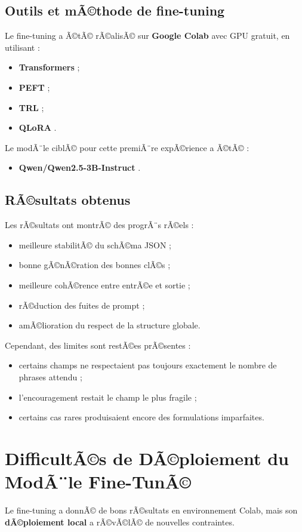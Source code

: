 ﻿\documentclass[12pt,a4paper]{article}
\begin{document}
\subsection{Outils et mÃ©thode de fine-tuning}
Le fine-tuning a Ã©tÃ© rÃ©alisÃ© sur \textbf{Google Colab} avec GPU gratuit, en utilisant :
\begin{itemize}
    \item \textbf{Transformers} \cite{transformers} ;
    \item \textbf{PEFT} \cite{peft} ;
    \item \textbf{TRL} ;
    \item \textbf{QLoRA} \cite{qlora}.
\end{itemize}

Le modÃ¨le ciblÃ© pour cette premiÃ¨re expÃ©rience a Ã©tÃ© :
\begin{itemize}
    \item \textbf{Qwen/Qwen2.5-3B-Instruct} \cite{qwen25}.
\end{itemize}

\subsection{RÃ©sultats obtenus}
Les rÃ©sultats ont montrÃ© des progrÃ¨s rÃ©els :
\begin{itemize}
    \item meilleure stabilitÃ© du schÃ©ma JSON ;
    \item bonne gÃ©nÃ©ration des bonnes clÃ©s ;
    \item meilleure cohÃ©rence entre entrÃ©e et sortie ;
    \item rÃ©duction des fuites de prompt ;
    \item amÃ©lioration du respect de la structure globale.
\end{itemize}

Cependant, des limites sont restÃ©es prÃ©sentes :
\begin{itemize}
    \item certains champs ne respectaient pas toujours exactement le nombre de phrases attendu ;
    \item l'encouragement restait le champ le plus fragile ;
    \item certains cas rares produisaient encore des formulations imparfaites.
\end{itemize}

\section{DifficultÃ©s de DÃ©ploiement du ModÃ¨le Fine-TunÃ©}
Le fine-tuning a donnÃ© de bons rÃ©sultats en environnement Colab, mais son \textbf{dÃ©ploiement local} a rÃ©vÃ©lÃ© de nouvelles contraintes.
\end{document}
